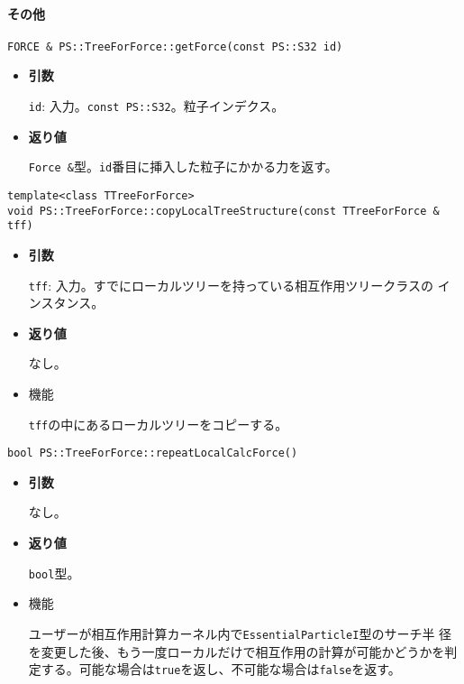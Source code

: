 \paragraph{その他}
\mbox{}

\begin{screen}
\begin{verbatim}
FORCE & PS::TreeForForce::getForce(const PS::S32 id)
\end{verbatim}
\end{screen}

\begin{itemize}

\item{{\bf 引数}}

{\tt id}: 入力。{\tt const PS::S32}。粒子インデクス。

\item{{\bf 返り値}}

{\tt Force \&}型。{\tt id}番目に挿入した粒子にかかる力を返す。

\end{itemize}

\begin{screen}
\begin{verbatim}
template<class TTreeForForce>
void PS::TreeForForce::copyLocalTreeStructure(const TTreeForForce & tff)
\end{verbatim}
\end{screen}

\begin{itemize}

\item{{\bf 引数}}

{\tt tff}: 入力。すでにローカルツリーを持っている相互作用ツリークラスの
インスタンス。

\item{{\bf 返り値}}

なし。

\item 機能

{\tt tff}の中にあるローカルツリーをコピーする。

\end{itemize}

\begin{screen}
\begin{verbatim}
bool PS::TreeForForce::repeatLocalCalcForce()
\end{verbatim}
\end{screen}

\begin{itemize}

\item{{\bf 引数}}

なし。

\item{{\bf 返り値}}

{\tt bool}型。

\item 機能

ユーザーが相互作用計算カーネル内で{\tt EssentialParticleI}型のサーチ半
径を変更した後、もう一度ローカルだけで相互作用の計算が可能かどうかを判
定する。可能な場合は{\tt true}を返し、不可能な場合は{\tt false}を返す。

\end{itemize}


